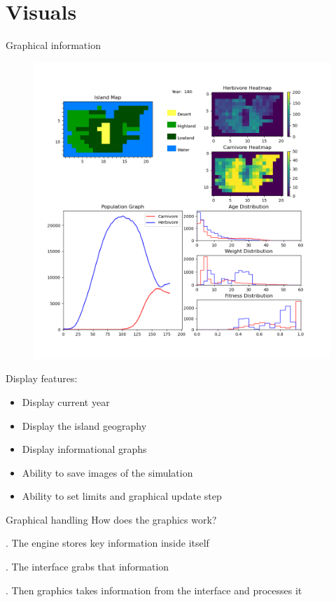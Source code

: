\section{Visuals}


\begin{frame}{Graphical information}
    \begin{figure}
	\centering
    	\includegraphics[scale=0.2]{test/test3_00180}
    \end{figure}
    Display features:
	\pause
    \begin{itemize}[<+->]
        \item Display current year
        \item Display the island geography
        \item Display informational graphs
        \item Ability to save images of the simulation
        \item Ability to set limits and graphical update step
    \end{itemize}
\end{frame}

\begin{frame}{Graphical handling}
    How does the graphics work?

    . The engine stores key information inside itself

    . The interface grabs that information

    . Then graphics takes information from the interface and processes it

\end{frame}
